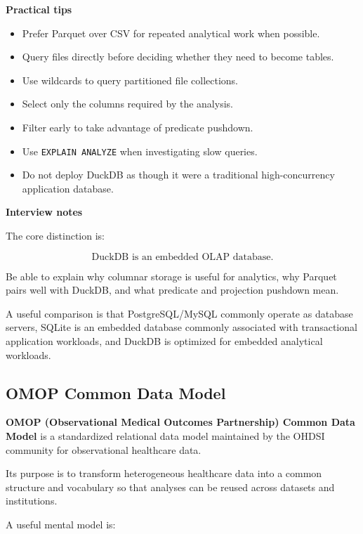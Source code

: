 \documentclass[11pt,letterpaper]{article}
\begin{document}
\textbf{Practical tips}

\begin{itemize}[leftmargin=*]
    \item Prefer Parquet over CSV for repeated analytical work when possible.
    \item Query files directly before deciding whether they need to become tables.
    \item Use wildcards to query partitioned file collections.
    \item Select only the columns required by the analysis.
    \item Filter early to take advantage of predicate pushdown.
    \item Use \texttt{EXPLAIN ANALYZE} when investigating slow queries.
    \item Do not deploy DuckDB as though it were a traditional high-concurrency
    application database.
\end{itemize}

\textbf{Interview notes}

The core distinction is:

\[
\boxed{\text{DuckDB is an embedded OLAP database.}}
\]

Be able to explain why columnar storage is useful for analytics, why Parquet
pairs well with DuckDB, and what predicate and projection pushdown mean.

A useful comparison is that PostgreSQL/MySQL commonly operate as database
servers, SQLite is an embedded database commonly associated with transactional
application workloads, and DuckDB is optimized for embedded analytical
workloads.



\subsection{OMOP Common Data Model}

\textbf{OMOP (Observational Medical Outcomes Partnership) Common Data Model}
is a standardized relational data model maintained by the OHDSI community for
observational healthcare data.

Its purpose is to transform heterogeneous healthcare data into a common
structure and vocabulary so that analyses can be reused across datasets and
institutions.

A useful mental model is:
\end{document}

